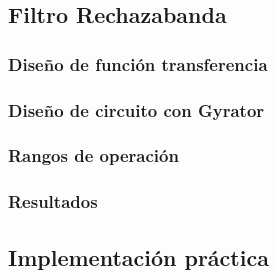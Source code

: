 \subsection{Filtro Rechazabanda}
\subsubsection{Dise\~no de funci\'on transferencia}
\subsubsection{Dise\~no de circuito con Gyrator}
\subsubsection{Rangos de operaci\'on}
\subsubsection{Resultados}

\subsection{Implementaci\'on pr\'actica}
